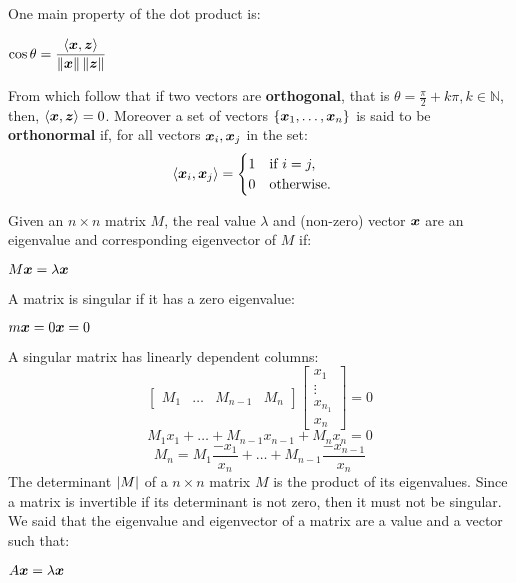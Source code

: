 One main property of the dot product is:
\begin{center}
	$\displaystyle \cos\theta=\frac{\left\langle\bm{x}, \bm{z}\right\rangle}{\left\lVert\bm{x}\right\rVert\left\lVert\bm{z}\right\rVert}$
\end{center}
From which follow that if two vectors are \textbf{orthogonal}, that is $\theta=\frac{\pi}{2}+k\pi, k\in\mathbb{N}$, then, $\left\langle\bm{x}, \bm{z}\right\rangle=0$. \newline
Moreover a set of vectors $\{\bm{x}_1, \hdots, \bm{x}_n\}$ is said to be \textbf{orthonormal} if, for all vectors $\bm{x}_i, \bm{x}_j$ in the set:
\[ \left\langle \bm{x}_i,\bm{x}_j \right\rangle=
\begin{cases}
	1\quad \text{if } i=j,\\
	0\quad \text{otherwise}.
\end{cases}
\]
\begin{definition}
Given an $n\times n$ matrix $M$, the real value $\lambda$ and (non-zero) vector $\bm{x}$ are an eigenvalue and corresponding eigenvector of $M$ if:
\begin{center}
	$\displaystyle M\bm{x}=\lambda\bm{x}$
\end{center}
\end{definition}
\begin{definition}
A matrix is singular if it has a zero eigenvalue:
\begin{center}
	$\displaystyle m\bm{x}=0\bm{x}=0$
\end{center}
\end{definition}
A singular matrix has linearly dependent columns:
\[
\begin{bmatrix}
	M_1&\hdots &M_{n-1}&M_n
\end{bmatrix}
\begin{bmatrix}
	x_1\\
	\vdots\\
	x_{n_1}\\
	x_n
\end{bmatrix} = 0
\]
\[ M_1x_1+\hdots+M_{n-1}x_{n-1}+M_nx_n=0 \]
\[ M_n=M_1\frac{-x_1}{x_n}+\hdots+M_{n-1}\frac{-x_{n-1}}{x_n} \]
The determinant $\vert M \vert$ of a $n\times n$ matrix $M$ is the product of its eigenvalues. \newline
Since a matrix is invertible if its determinant is not zero, then it must not be singular. \newline
We said that the eigenvalue and eigenvector of a matrix are a value and a vector such that:
\begin{center}
	$\displaystyle A\bm{x}=\lambda\bm{x}$
\end{center}
